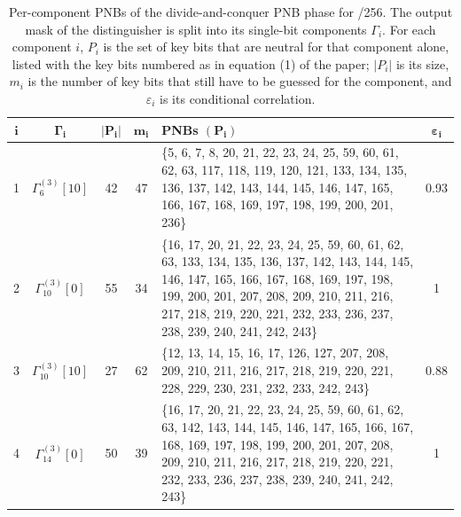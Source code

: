 \begin{table}[!htbp]
\centering
\renewcommand{\arraystretch}{1.6}
\setlength{\tabcolsep}{8pt}
\caption{Per-component PNBs of the divide-and-conquer PNB phase for /256. The output mask of the distinguisher is split into its single-bit components $\Gamma_i$. For each component $i$, $P_i$ is the set of key bits that are neutral for that component alone, listed with the key bits numbered as in equation (1) of the paper; $|P_i|$ is its size, $m_i$ is the number of key bits that still have to be guessed for the component, and $\varepsilon_i$ is its conditional correlation.}
\label{app:pnbtab-5}
\begin{tabular}{@{}cccc p{8cm} c@{}}
\toprule
$\boldsymbol{i}$ & $\boldsymbol{\Gamma_i}$ & $\boldsymbol{|P_i|}$ & $\boldsymbol{m_i}$ & \textbf{PNBs $(\boldsymbol{P_i})$} & $\boldsymbol{\varepsilon_i}$ \\
\midrule
1 & $\Gamma^{(3)}_{6}[10]$ & 42 & 47 &
\{5, 6, 7, 8, 20, 21, 22, 23, 24, 25, 59, 60, 61, 62, 63, 117, 118, 119, 120, 121, 133, 134, 135, 136, 137, 142, 143, 144, 145, 146, 147, 165, 166, 167, 168, 169, 197, 198, 199, 200, 201, 236\} & 0.93 \\
\midrule
2 & $\Gamma^{(3)}_{10}[0]$ & 55 & 34 &
\{16, 17, 20, 21, 22, 23, 24, 25, 59, 60, 61, 62, 63, 133, 134, 135, 136, 137, 142, 143, 144, 145, 146, 147, 165, 166, 167, 168, 169, 197, 198, 199, 200, 201, 207, 208, 209, 210, 211, 216, 217, 218, 219, 220, 221, 232, 233, 236, 237, 238, 239, 240, 241, 242, 243\} & 1 \\
\midrule
3 & $\Gamma^{(3)}_{10}[10]$ & 27 & 62 &
\{12, 13, 14, 15, 16, 17, 126, 127, 207, 208, 209, 210, 211, 216, 217, 218, 219, 220, 221, 228, 229, 230, 231, 232, 233, 242, 243\} & 0.88 \\
\midrule
4 & $\Gamma^{(3)}_{14}[0]$ & 50 & 39 &
\{16, 17, 20, 21, 22, 23, 24, 25, 59, 60, 61, 62, 63, 142, 143, 144, 145, 146, 147, 165, 166, 167, 168, 169, 197, 198, 199, 200, 201, 207, 208, 209, 210, 211, 216, 217, 218, 219, 220, 221, 232, 233, 236, 237, 238, 239, 240, 241, 242, 243\} & 1 \\
\bottomrule
\end{tabular}
\end{table}
